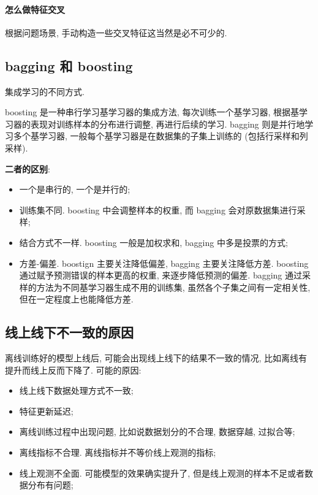 \paragraph{怎么做特征交叉}
根据问题场景, 手动构造一些交叉特征这当然是必不可少的. 


\subsection{bagging 和 boosting}
集成学习的不同方式. 

boosting 是一种串行学习基学习器的集成方法, 每次训练一个基学习器, 根据基学习器的表现对训练样本的分布进行调整, 再进行后续的学习. bagging 则是并行地学习多个基学习器, 一般每个基学习器是在数据集的子集上训练的 (包括行采样和列采样). 

\textbf{二者的区别}:
\begin{itemize}
	\item 一个是串行的, 一个是并行的;
	
	\item 训练集不同. boosting 中会调整样本的权重, 而 bagging 会对原数据集进行采样;
	
	\item 结合方式不一样. boosting 一般是加权求和, bagging 中多是投票的方式;
	
	\item 方差-偏差. boostign 主要关注降低偏差, bagging 主要关注降低方差. boosting 通过赋予预测错误的样本更高的权重, 来逐步降低预测的偏差. bagging 通过采样的方法为不同基学习器生成不用的训练集, 虽然各个子集之间有一定相关性, 但在一定程度上也能降低方差.
\end{itemize}

\subsection{线上线下不一致的原因}
离线训练好的模型上线后, 可能会出现线上线下的结果不一致的情况, 比如离线有提升而线上反而下降了. 可能的原因:
\begin{itemize}
	\item 线上线下数据处理方式不一致;
	
	\item 特征更新延迟;
	
	\item 离线训练过程中出现问题, 比如说数据划分的不合理, 数据穿越, 过拟合等;
	
	\item 离线指标不合理. 离线指标并不等价线上观测的指标;
	
	\item 线上观测不全面. 可能模型的效果确实提升了, 但是线上观测的样本不足或者数据分布有问题;
\end{itemize}